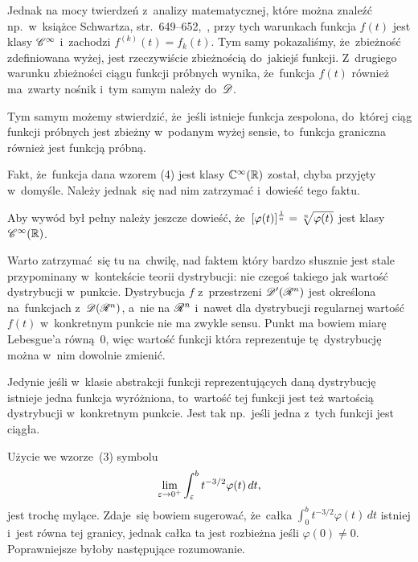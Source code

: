 \documentclass[a4paper,11pt]{article}
\begin{document}
Jednak na mocy twierdzeń z~analizy matematycznej, które można znaleźć
np.~w~książce Schwartza, str.~649--652,~\cite{Schwartz79}, przy tych
warunkach funkcja $f( t )$ jest klasy $\mathcal{C}^{ \infty }$ i~zachodzi
$f^{ ( k ) }( t ) = f_{ k }( t )$. Tym samy pokazaliśmy, że~zbieżność
zdefiniowana wyżej, jest rzeczywiście zbieżnością do~jakiejś funkcji.
Z~drugiego warunku zbieżności ciągu funkcji próbnych wynika,
że~funkcja $f( t )$ również ma~zwarty nośnik i~tym samym należy
do~$\mathcal{D}$.

Tym samym możemy stwierdzić, że~jeśli istnieje funkcja zespolona,
do~której ciąg funkcji próbnych jest zbieżny w~podanym wyżej sensie,
to~funkcja graniczna również jest funkcją próbną.

\vspace{\spaceFour}


\start {} Fakt, że~funkcja dana wzorem (4) jest klasy
$\mathbb{C}^{ \infty }( \mathbb{R} )$ został, chyba przyjęty w~domyśle. Należy jednak~się
nad nim zatrzymać i~dowieść tego faktu. \Dok

\vspace{\spaceFour}


\start {} Aby wywód był pełny należy jeszcze dowieść,
że~$[ \varphi( t ) ]^{ \frac{ 1 }{ n } } = \sqrt[ n ]{ \varphi( t ) }$ jest
klasy $\mathcal{C}^{ \infty }( \mathbb{R} )$.

\vspace{\spaceFour}


\start {} Warto zatrzymać~się tu na~chwilę, nad faktem który
bardzo słusznie jest stale przypominany w~kontekście teorii
dystrybucji: nie czegoś takiego jak wartość dystrybucji w~punkcie.
Dystrybucja $f$ z~przestrzeni $\mathcal{D}'( \mathcal{R}^{ n } )$ jest określona
na~funkcjach z~$\mathcal{D}( \mathcal{R}^{ n } )$, a~nie na $\mathcal{R}^{ n }$ i~nawet dla dystrybucji
regularnej wartość $f( t )$ w~konkretnym punkcie nie ma zwykle sensu.
Punkt ma bowiem miarę Lebesgue'a równą~0, więc wartość funkcji która
reprezentuje tę~dystrybucję można w~nim dowolnie zmienić.

Jedynie jeśli w~klasie abstrakcji funkcji reprezentujących daną
dystrybucję istnieje jedna funkcja wyróżniona, to~wartość tej funkcji
jest też wartością dystrybucji w~konkretnym punkcie. Jest tak
np.~jeśli jedna z~tych funkcji jest ciągła.

\vspace{\spaceFour}


\start {} Użycie we wzorze~(3) symbolu
\begin{equation}
  \label{eq:Zem-s01-01}
  \lim\limits_{ \varepsilon \to 0^{ + } } \int_{ \varepsilon }^{ b } t^{ -3/2 } \varphi( t ) \, dt,
\end{equation}
jest trochę mylące. Zdaje~się bowiem sugerować, że~całka
$\int_{ 0 }^{ b } t^{ -3/2 } \varphi( t ) \, dt$ istniej i~jest równa tej
granicy, jednak całka ta jest rozbieżna jeśli $\varphi( 0 ) \neq 0$.
Poprawniejsze byłoby następujące rozumowanie.
\end{document}
